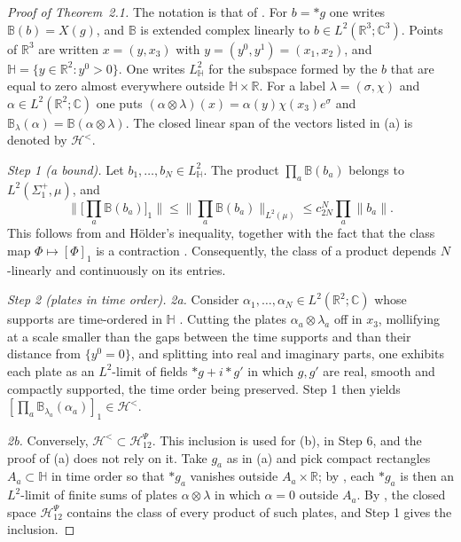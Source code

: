 \documentclass[11pt]{amsart}
\theoremstyle{definition}
\begin{document}
\begin{proof}[Proof of Theorem~2.1]
The notation is that of \cite[Definitions~14.1 and~14.5]{QEDII}.
For $b=\ast g$ one writes $\mathbb B(b)=X(g)$, and $\mathbb B$ is extended complex linearly to $b\in L^2(\mathbb R^3;\mathbb C^3)$.
Points of $\mathbb R^3$ are written $x=(y,x_3)$ with $y=(y^0,y^1)=(x_1,x_2)$, and $\mathbb H=\{y\in\mathbb R^2:y^0>0\}$.
One writes $L^2_{\mathbb H}$ for the subspace formed by the $b$ that are equal to zero almost everywhere outside $\mathbb H\times\mathbb R$.
For a label $\lambda=(\sigma,\chi)$ and $\alpha\in L^2(\mathbb R^2;\mathbb C)$ one puts $(\alpha\otimes\lambda)(x)=\alpha(y)\chi(x_3)e^\sigma$ and $\mathbb B_\lambda(\alpha)=\mathbb B(\alpha\otimes\lambda)$.
The closed linear span of the vectors listed in (a) is denoted by $\mathcal H^{<}$.

\emph{Step 1 (a bound).}
Let $b_1,\dots,b_N\in L^2_{\mathbb H}$.
The product $\prod_a\mathbb B(b_a)$ belongs to $L^2(\Sigma_1^+,\mu)$, and
\begin{equation*}
\Big\|\Big[\prod_a\mathbb B(b_a)\Big]_1\Big\|\le\Big\|\prod_a\mathbb B(b_a)\Big\|_{L^2(\mu)}\le c_{2N}^N\prod_a\|b_a\|.
\end{equation*}
This follows from \cite[Lemma~14.3\,(a)]{QEDII} and H\"older's inequality, together with the fact that the class map $\Phi\mapsto[\Phi]_1$ is a contraction \cite[Proposition~8.19\,(i)]{QEDI}.
Consequently, the class of a product depends $N$-linearly and continuously on its entries.

\emph{Step 2 (plates in time order).}
\emph{2a.} Consider $\alpha_1,\dots,\alpha_N\in L^2(\mathbb R^2;\mathbb C)$ whose supports are time-ordered in $\mathbb H$ \cite[Definition~14.21]{QEDII}.
Cutting the plates $\alpha_a\otimes\lambda_a$ off in $x_3$, mollifying at a scale smaller than the gaps between the time supports and than their distance from $\{y^0=0\}$, and splitting into real and imaginary parts, one exhibits each plate as an $L^2$-limit of fields $\ast g+i\ast g'$ in which $g,g'$ are real, smooth and compactly supported, the time order being preserved.
Step 1 then yields $[\prod_a\mathbb B_{\lambda_a}(\alpha_a)]_1\in\mathcal H^{<}$.

\emph{2b.} Conversely, $\mathcal H^{<}\subset\mathcal H^{\Psi}_{12}$.
This inclusion is used for (b), in Step 6, and the proof of (a) does not rely on it.
Take $g_a$ as in (a) and pick compact rectangles $A_a\subset\mathbb H$ in time order so that $\ast g_a$ vanishes outside $A_a\times\mathbb R$; by \cite[Lemma~14.8\,(a)]{QEDII}, each $\ast g_a$ is then an $L^2$-limit of finite sums of plates $\alpha\otimes\lambda$ in which $\alpha=0$ outside $A_a$.
By \cite[Proposition~14.47\,(c)]{QEDII}, the closed space $\mathcal H^{\Psi}_{12}$ contains the class of every product of such plates, and Step 1 gives the inclusion.


\end{proof}
\end{document}
